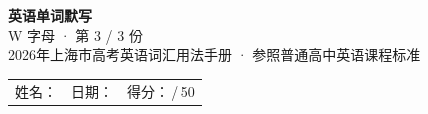 \documentclass[10pt,a4paper]{article}
\begin{document}
\pagestyle{plain}

\begin{center}
{\LARGE\bfseries 英语单词默写}\\[0.22em]
{\large W 字母 · 第 3 / 3 份}\\[0.18em]
{\small 2026年上海市高考英语词汇用法手册 · 参照普通高中英语课程标准}
\end{center}

\vspace{0.25em}
\noindent\begin{tabular}{@{}p{}@{}p{}@{}p{}@{}}
姓名：\underline{\hspace{2.0cm}} & 日期：\underline{\hspace{2.0cm}} & 得分：\underline{\hspace{1.3cm}}\,/\,50 \\
\end{tabular}

\vspace{0.3em}

\vspace{0.08em}
\end{document}
